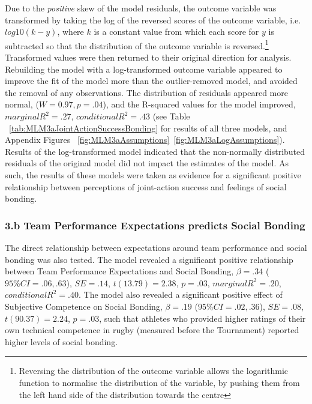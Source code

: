Due to the \textit{positive} skew of the model residuals, the outcome variable was transformed by taking the log of the reversed scores of the outcome variable, i.e. $log10(k - y)$, where $k$ is a constant value from which each score for $y$ is subtracted so that the distribution of the outcome variable is reversed\citep{Howell2012}.\footnote{Reversing the distribution of the outcome variable allows the logarithmic function to normalise the distribution of the variable, by pushing them from the left hand side of the distribution towards the centre}  Transformed values were then returned to their original direction for analysis\citep{Field2012}.  Rebuilding the model with a log-transformed outcome variable appeared to improve the fit of the model more than the outlier-removed model, and avoided the removal of any observations.
The distribution of residuals appeared more normal, ($W = 0.97, p = .04$), and the R-squared values for the model improved, $marginal R^2 = .27$, $conditional R^2 = .43$ (see Table ~\ref{tab:MLM3aJointActionSuccessBonding} for results of all three models, and Appendix Figures ~\ref{fig:MLM3aAssumptions}\nobreakdash~\ref{fig:MLM3aLogAssumptions}).  Results of the log-transformed model indicated that the non-normally distributed residuals of the original model did not impact the estimates of the model. As such, the results of these models were taken as evidence for a significant positive relationship between perceptions of joint-action success and feelings of social bonding.




\subsubsection{3.b Team Performance Expectations predicts Social Bonding} %

The direct relationship between expectations around team performance and social bonding was also tested.  The model revealed a significant positive relationship between Team Performance Expectations and Social Bonding, $\beta = .34$ ($95\% CI =  .06, .63$), $SE = .14$, $t(13.79) = 2.38$, $p = .03$, $marginal R^2 = .20$, $conditional R^2 = .40$.  The model also revealed a significant positive effect of Subjective Competence on Social Bonding, $\beta = .19$ ($95\% CI =  .02, .36$), $SE = .08$, $t(90.37) = 2.24$, $p = .03$, such that athletes who provided higher ratings of their own technical competence in rugby (measured before the Tournament) reported higher levels of social bonding.

